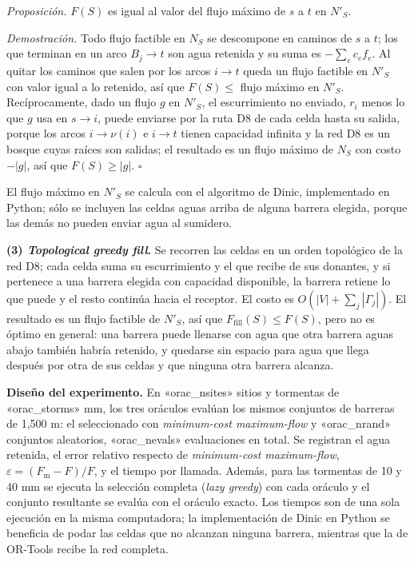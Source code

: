 \emph{Proposición.} $F(S)$ es igual al valor del flujo máximo de $s$ a $t$ en $N'_S$.

\emph{Demostración.} Todo flujo factible en $N_S$ se descompone en caminos de $s$ a $t$; los que terminan en un arco $B_j\to t$ son agua retenida y su suma es $-\sum_e c_ef_e$. Al quitar los caminos que salen por los arcos $i\to t$ queda un flujo factible en $N'_S$ con valor igual a lo retenido, así que $F(S)\le$ flujo máximo en $N'_S$. Recíprocamente, dado un flujo $g$ en $N'_S$, el escurrimiento no enviado, $r_i$ menos lo que $g$ usa en $s\to i$, puede enviarse por la ruta D8 de cada celda hasta su salida, porque los arcos $i\to\nu(i)$ e $i\to t$ tienen capacidad infinita y la red D8 es un bosque cuyas raíces son salidas; el resultado es un flujo máximo de $N_S$ con costo $-|g|$, así que $F(S)\ge|g|$. $\square$

El flujo máximo en $N'_S$ se calcula con el algoritmo de Dinic, implementado en Python; sólo se incluyen las celdas aguas arriba de alguna barrera elegida, porque las demás no pueden enviar agua al sumidero.

\textbf{(3) \emph{Topological greedy fill}.} Se recorren las celdas en un orden topológico de la red D8; cada celda suma su escurrimiento y el que recibe de sus donantes, y si pertenece a una barrera elegida con capacidad disponible, la barrera retiene lo que puede y el resto continúa hacia el receptor. El costo es $O(|V|+\sum_j|\Gamma_j|)$. El resultado es un flujo factible de $N'_S$, así que $F_{\text{fill}}(S)\le F(S)$, pero no es óptimo en general: una barrera puede llenarse con agua que otra barrera aguas abajo también habría retenido, y quedarse sin espacio para agua que llega después por otra de sus celdas y que ninguna otra barrera alcanza.

\textbf{Diseño del experimento.} En «orac_nsites» sitios y tormentas de «orac_storms» mm, los tres oráculos evalúan los mismos conjuntos de barreras de 1,500 m: el seleccionado con \emph{minimum-cost maximum-flow} y «orac_nrand» conjuntos aleatorios, «orac_nevals» evaluaciones en total. Se registran el agua retenida, el error relativo respecto de \emph{minimum-cost maximum-flow}, $\varepsilon=(F_{\text{m}}-F)/F$, y el tiempo por llamada. Además, para las tormentas de 10 y 40 mm se ejecuta la selección completa (\emph{lazy greedy}) con cada oráculo y el conjunto resultante se evalúa con el oráculo exacto. Los tiempos son de una sola ejecución en la misma computadora; la implementación de Dinic en Python se beneficia de podar las celdas que no alcanzan ninguna barrera, mientras que la de OR-Tools recibe la red completa.


